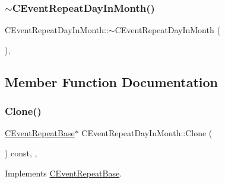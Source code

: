 \subsubsection{\texorpdfstring{$\sim$\+C\+Event\+Repeat\+Day\+In\+Month()}{~CEventRepeatDayInMonth()}}
{\footnotesize\ttfamily C\+Event\+Repeat\+Day\+In\+Month\+::$\sim$\+C\+Event\+Repeat\+Day\+In\+Month (\begin{DoxyParamCaption}{ }\end{DoxyParamCaption})\hspace{0.3cm}{\ttfamily [override]}, {\ttfamily [default]}}



\subsection{Member Function Documentation}
\mbox{\label{class_c_event_repeat_day_in_month_a329373945107435d629ecc2491ce8b38}} 
\subsubsection{\texorpdfstring{Clone()}{Clone()}}
{\footnotesize\ttfamily \mbox{\hyperlink{class_c_event_repeat_base}{C\+Event\+Repeat\+Base}}$\ast$ C\+Event\+Repeat\+Day\+In\+Month\+::\+Clone (\begin{DoxyParamCaption}{ }\end{DoxyParamCaption}) const\hspace{0.3cm}{\ttfamily [inline]}, {\ttfamily [override]}, {\ttfamily [virtual]}}



Implements \mbox{\hyperlink{class_c_event_repeat_base_a73b079543ea6d97d38933b6a7544e349}{C\+Event\+Repeat\+Base}}.

\mbox{\label{class_c_event_repeat_day_in_month_a84de2696efb387af591bff04f37fd7ed}} 
